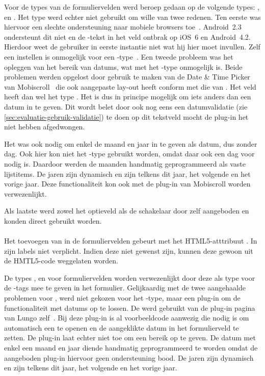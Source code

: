 Voor de types van de formuliervelden werd beroep gedaan op de volgende types: ,  en . 
Het  type werd echter niet gebruikt om wille van twee redenen.
Ten eerste was hiervoor een slechte ondersteuning naar mobiele browsers toe~\cite{Deveria2013c}.
Android~2.3 ondersteunt dit niet en de -tekst in het veld ontbrak op iOS~6 en Android~4.2.
Hierdoor weet de gebruiker in eerste instantie niet wat hij hier moet invullen. 
Zelf een  instellen is onmogelijk voor een -type~\cite{Berjon2012}. 
Een tweede probleem was het opleggen van het bereik van datums, wat met het -type onmogelijk is. 
Beide problemen werden opgelost door gebruik te maken van de Date \& Time Picker van Mobiscroll~\cite{Mobiscroll2013} die ook aangepaste lay-out heeft conform met die van \jqm{}. 
Het veld heeft dan wel het type .
Het is dus in principe mogelijk om iets anders dan een datum in te geven. 
Dit wordt belet door ook nog eens een datumvalidatie (zie \ref{sec:evaluatie-gebruik-validatie}) te doen op dit tekstveld mocht de plug-in het niet hebben afgedwongen.
 
Het was ook nodig om enkel de maand en jaar in te geven als datum, dus zonder dag.
Ook hier kon niet het -type gebruikt worden, omdat daar ook een dag voor nodig is. 
Daardoor werden de maanden handmatig geprogrammeerd als vaste lijstitems. 
De jaren zijn dynamisch en zijn telkens dit jaar, het volgende en het vorige jaar. 
Deze functionaliteit kon ook met de plug-in van Mobiscroll worden verwezenlijkt.

Als laatste werd zowel het optieveld als de schakelaar door \jqm{} zelf aangeboden en konden direct gebruikt worden. 
 
\paragraph{\lungo} 
Het toevoegen van  in de formuliervelden gebeurt met het HTML5-atttribuut .
In \lungo{} zijn labels niet verplicht.
Indien deze niet gewenst zijn, kunnen deze gewoon uit de HMTL5-code weggelaten worden.

De types ,  en  voor formuliervelden worden verwezenlijkt door deze als type voor de -tags mee te geven in het formulier.
Gelijkaardig met de twee aangehaalde problemen voor \jqm{}, werd niet gekozen voor het -type, maar een plug-in om de functionaliteit met datums op te lossen.
De  werd gebruikt van de plug-in pagina van Lungo zelf~\cite{TapQuo2013b}.
Bij deze plug-in is al voorbeeldcode aanwezig die nodig is om automatisch een  te openen en de aangeklikte datum in het formulierveld te zetten.
De plug-in laat echter niet toe om een bereik op te geven.
De datum met enkel een maand en jaar diende handmatig geprogrammeerd te worden omdat de aangeboden plug-in hiervoor geen ondersteuning bood.
De jaren zijn dynamisch en zijn telkens dit jaar, het volgende en het vorige jaar. 

